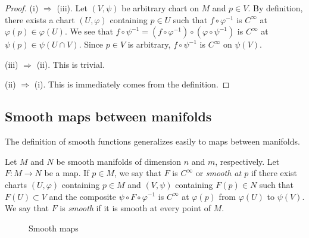\begin{proof}
    (i) $\Rightarrow$ (iii). Let $(V, \psi)$ be arbitrary chart on $M$ and $p \in V$. By definition, there exists a chart $(U, \varphi)$ containing $p \in U$ such that $f \circ \varphi^{-1}$ is $C^\infty$ at $\varphi(p) \in \varphi(U)$. We see that $f \circ \psi^{-1} = (f \circ \varphi^{-1}) \circ (\varphi \circ \psi^{-1})$ is $C^\infty$ at $\psi(p) \in \psi(U \cap V)$. Since $p \in V$ is arbitrary, $f \circ \psi^{-1}$ is $C^\infty$ on $\psi(V)$.

    (iii) $\Rightarrow$ (ii). This is trivial.

    (ii) $\Rightarrow$ (i). This is immediately comes from the definition.
\end{proof}

\subsection{Smooth maps between manifolds}

The definition of smooth functions generalizes easily to maps between manifolds.

\begin{definition}
    Let $M$ and $N$ be smooth manifolds of dimension $n$ and $m$, respectively. Let $F : M \to N$ be a map. If $p \in M$, we say that $F$ is $C^\infty$ or \emph{smooth at $p$} if there exist charts $(U, \varphi)$ containing $p \in M$ and $(V, \psi)$ containing $F(p) \in N$ such that $F(U) \subset V$ and the composite $\psi \circ F \circ \varphi^{-1}$ is $C^\infty$ at $\varphi(p)$ from $\varphi(U)$ to $\psi(V)$. We say that $F$ is \emph{smooth} if it is smooth at every point of $M$.
\end{definition}

\begin{figure}[h]
    \centering
    
    \caption{Smooth maps}
\end{figure}

